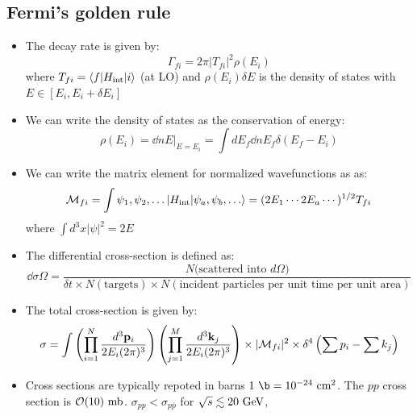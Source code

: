 \subsection{Fermi's golden rule}
\begin{itemize}
  \item The decay rate is given by:
  \begin{equation}
    \Gamma_{fi} = 2\pi |T_{fi}|^2\rho(E_i)
  \end{equation}
  where $T_{fi} = \langle f | H_\text{int}|i\rangle$ (at LO) and $\rho(E_i)\delta E$ is the density of states with $E\in [E_i,E_i+\delta E_i]$
  \item We can write the density of states as the conservation of energy:
  \begin{equation}
    \rho(E_i) = \left.\dd{n}{E}\right|_{E=E_i} = \int d E_f \dd{n}{E_f} \delta(E_f - E_i)
  \end{equation}
  \item We can write the matrix element for normalized wavefunctions as as:
  \begin{equation}
    \Mme_{fi} = \int \psi_1,\psi_2,\dots|H_\text{int}|\psi_a,\psi_b,\dots\ra = (2E_1\cdots2E_a\cdots)^{1/2} T_{fi}
  \end{equation}
  where $\int d^3x|\psi|^2 = 2E$
  \item The differential cross-section is defined as:
  \begin{equation}
    \dd\sigma\Omega = \frac{N\text{(scattered into $d\Omega$)}}{\delta t \times N(\text{targets}) \times N(\text{incident particles per unit time per unit area})}
  \end{equation}
  \item The total cross-section is given by:
  \begin{equation}
    \sigma = \int \left(\prod_{i=1}^N \dfrac{d^3\mathbf{p}_i}{2E_i(2\pi)^3}\right) \left(\prod_{j=1}^M \dfrac{d^3\mathbf{k}_j}{2E_i(2\pi)^3}\right) \times |\mathcal{M}_{fi}|^2 \times \delta^4\left(\sum p_i - \sum k_j\right)
  \end{equation}
  \item Cross sections are typically repoted in barns $1~\b = 10^{-24}~\cm^2$. The $pp$ cross section is $\mathcal{O}(10)~\text{mb}$. $\sigma_{pp} < \sigma_{p\bar p}$ for $\sqrt{s} \lesssim 20~\text{GeV}$, 
\end{itemize}

